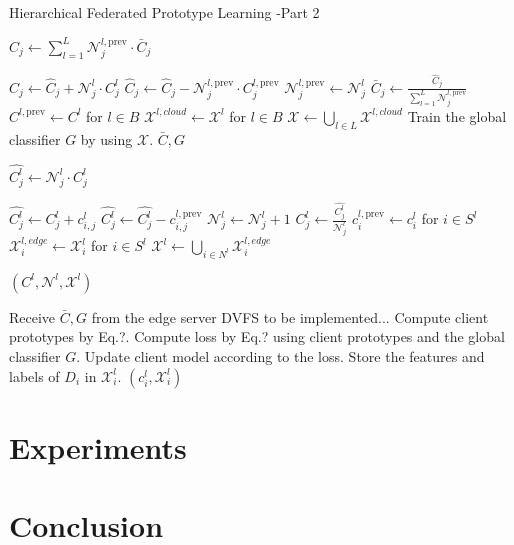 \documentclass[journal]{IEEEtran}
\begin{document}
\begin{algorithm}[H]
  \caption{Hierarchical Federated Prototype Learning -Part 2}
  \begin{algorithmic}[1]
    \State \( \hat{C}_{j} \gets \sum_{l=1}^{L} {\mathcal{N}_j^{l,\text{prev}}} \cdot\bar{C}_{j} \) 

    \State \( \hat{C}_{j}  \gets \hat{C}_{j} + {\mathcal{N}_j^l} \cdot C^l_j \)
    \State \( \hat{C}_{j}  \gets \hat{C}_{j} - {\mathcal{N}_j^{l,\text{prev}}} \cdot C_j^{l, \text{prev}} \)
    \EndIf
    \State \( {\mathcal{N}_j^{l,\text{prev}}} \gets \mathcal{N}_j^l \)
    \EndFor
    \State \( \bar{C}_{j} \gets \frac{\hat{C}_{j}}{\sum_{l=1}^{L} {\mathcal{N}_j^{l,\text{prev}}}} \)
    \EndFor
    \State \( C^{l,\text{prev}} \gets C^l \) for \( l \in B \)
    \State \( \mathcal{X}^{l,cloud} \gets \mathcal{X}^l \) for \(l \in B \)
    \State \( \mathcal{X} \gets \bigcup_{l \in L} \mathcal{X}^{l,cloud} \)
    \State Train the global classifier \( G \) by using \( \mathcal{X} \).
    \State \Return \( \bar{C}, G \)
    \EndProcedure

    \State \( {\hat{C^l_j}} \gets \mathcal{N}^l_j \cdot C^l_{j} \)

    \State \( {\hat{C^l_j}}  \gets {\hat{C^l_j}} + c^l_{i,j} \)
    \State \( {\hat{C^l_j}}  \gets {\hat{C^l_j}} - c^{l,\text{prev}}_{i,j}\)
    \Else
    \State \( \mathcal{N}_j^l \gets \mathcal{N}_j^l + 1 \)
    \EndIf
    \EndFor
    \State \( {C^l_j} \gets \frac{{\hat{C^l_j}}}{\mathcal{N}_j^l} \)
    \EndFor
    \State \( c^{l,\text{prev}}_i \gets c^l_i \) for \( i \in S^l \)
    \State \( \mathcal{X}^{l,edge}_i \gets  \mathcal{X}^l_i \) for \( i \in S^l \)
    \State \( \mathcal{X}^l \gets \bigcup_{i \in N^l} \mathcal{X}^{l,edge}_i \)

    \State \Return \( (C^l, \mathcal{N}^l, \mathcal{X}^l) \)
    \EndProcedure

    \State Receive \( \bar{C}, G \) from the edge server
    \State DVFS to be implemented...
    \State Compute client prototypes by Eq.?.
    \State Compute loss by Eq.? using client prototypes and the global classifier $G$.
    \State Update client model according to the loss.
    \EndFor
    \State Store the features and labels of \(D_i\) in \( \mathcal{X}^l_i \).
    \EndFor
    \State \Return \( (c^l_i, \mathcal{X}^l_i) \)
    \EndProcedure
  \end{algorithmic}
\end{algorithm}

\section{Experiments}

\section{Conclusion}
\end{document}

